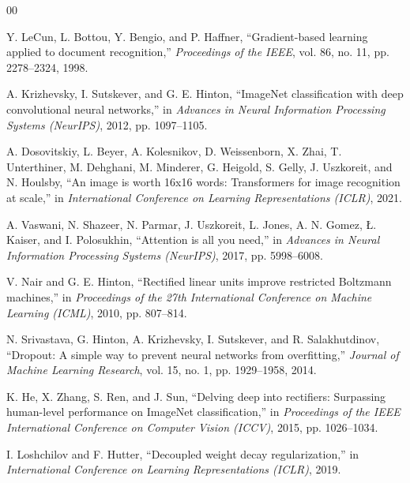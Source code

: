\documentclass[conference]{IEEEtran}
\begin{document}
\begin{thebibliography}{00}

Y. LeCun, L. Bottou, Y. Bengio, and P. Haffner, ``Gradient-based learning applied to document recognition,'' \emph{Proceedings of the IEEE}, vol. 86, no. 11, pp. 2278--2324, 1998.

A. Krizhevsky, I. Sutskever, and G. E. Hinton, ``ImageNet classification with deep convolutional neural networks,'' in \emph{Advances in Neural Information Processing Systems (NeurIPS)}, 2012, pp. 1097--1105.

A. Dosovitskiy, L. Beyer, A. Kolesnikov, D. Weissenborn, X. Zhai, T. Unterthiner, M. Dehghani, M. Minderer, G. Heigold, S. Gelly, J. Uszkoreit, and N. Houlsby, ``An image is worth 16x16 words: Transformers for image recognition at scale,'' in \emph{International Conference on Learning Representations (ICLR)}, 2021.

A. Vaswani, N. Shazeer, N. Parmar, J. Uszkoreit, L. Jones, A. N. Gomez, Ł. Kaiser, and I. Polosukhin, ``Attention is all you need,'' in \emph{Advances in Neural Information Processing Systems (NeurIPS)}, 2017, pp. 5998--6008.

V. Nair and G. E. Hinton, ``Rectified linear units improve restricted Boltzmann machines,'' in \emph{Proceedings of the 27th International Conference on Machine Learning (ICML)}, 2010, pp. 807--814.

N. Srivastava, G. Hinton, A. Krizhevsky, I. Sutskever, and R. Salakhutdinov, ``Dropout: A simple way to prevent neural networks from overfitting,'' \emph{Journal of Machine Learning Research}, vol. 15, no. 1, pp. 1929--1958, 2014.

K. He, X. Zhang, S. Ren, and J. Sun, ``Delving deep into rectifiers: Surpassing human-level performance on ImageNet classification,'' in \emph{Proceedings of the IEEE International Conference on Computer Vision (ICCV)}, 2015, pp. 1026--1034.

I. Loshchilov and F. Hutter, ``Decoupled weight decay regularization,'' in \emph{International Conference on Learning Representations (ICLR)}, 2019.

\end{thebibliography}
\end{document}
